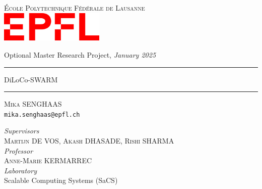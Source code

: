 \documentclass{article}
\begin{document}
\begin{titlepage}
\begin{center}
    \Large{\textsc{École Polytechnique Fédérale de Lausanne}}\\
    \vspace{1cm}
    \includegraphics[width=5cm]{figures/epfl.png}
    \vspace{1cm}
    
    \large{Optional Master Research Project, \textit{January 2025}}\\
    
    \vspace{1cm}
    \rule{\textwidth}{1pt}\vspace{15pt}
    \Huge{DiLoCo-SWARM}
    \rule{\textwidth}{1pt}
    
    \vspace{1cm}
    
    \large{\textsc{Mika SENGHAAS}\\\texttt{mika.senghaas@epfl.ch}}
    
    \large{
      \textit{Supervisors}\\
      \textsc{Martijn DE VOS}, \textsc{Akash DHASADE}, \textsc{Rishi SHARMA}}\\
      \vspace{0.5cm}
      \textit{Professor}\\
      \textsc{Anne-Marie KERMARREC}\\
      \vspace{0.5cm}
      \large{\textit{Laboratory}\\
      Scalable Computing Systems (SaCS)\\
    }
\end{center}
\end{titlepage}

\end{document}
